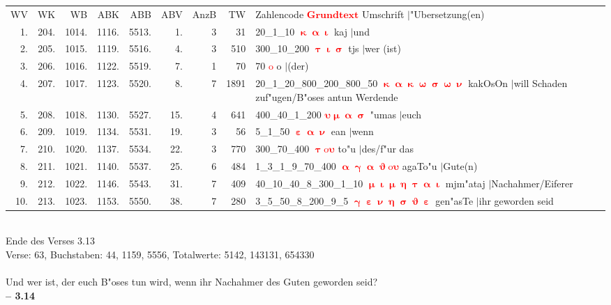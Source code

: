 \documentclass[a4paper,10pt,landscape]{article}
\begin{document}
\begin{tabular}{rrrrrrrrp{120mm}}
WV&WK&WB&ABK&ABB&ABV&AnzB&TW&Zahlencode \textcolor{red}{$\boldsymbol{Grundtext}$} Umschrift $|$"Ubersetzung(en)\\
1.&204.&1014.&1116.&5513.&1.&3&31&20\_1\_10 \textcolor{red}{$\boldsymbol{\upkappa\upalpha\upiota}$} kaj $|$und\\
2.&205.&1015.&1119.&5516.&4.&3&510&300\_10\_200 \textcolor{red}{$\boldsymbol{\uptau\upiota\upsigma}$} tjs $|$wer (ist)\\
3.&206.&1016.&1122.&5519.&7.&1&70&70 \textcolor{red}{$\boldsymbol{\mathrm{o}}$} o $|$(der)\\
4.&207.&1017.&1123.&5520.&8.&7&1891&20\_1\_20\_800\_200\_800\_50 \textcolor{red}{$\boldsymbol{\upkappa\upalpha\upkappa\upomega\upsigma\upomega\upnu}$} kakOsOn $|$will Schaden zuf"ugen/B"oses antun Werdende\\
5.&208.&1018.&1130.&5527.&15.&4&641&400\_40\_1\_200 \textcolor{red}{$\boldsymbol{\upsilon\upmu\upalpha\upsigma}$} "umas $|$euch\\
6.&209.&1019.&1134.&5531.&19.&3&56&5\_1\_50 \textcolor{red}{$\boldsymbol{\upepsilon\upalpha\upnu}$} ean $|$wenn\\
7.&210.&1020.&1137.&5534.&22.&3&770&300\_70\_400 \textcolor{red}{$\boldsymbol{\uptau\mathrm{o}\upsilon}$} to"u $|$des/f"ur das\\
8.&211.&1021.&1140.&5537.&25.&6&484&1\_3\_1\_9\_70\_400 \textcolor{red}{$\boldsymbol{\upalpha\upgamma\upalpha\upvartheta\mathrm{o}\upsilon}$} agaTo"u $|$Gute(n)\\
9.&212.&1022.&1146.&5543.&31.&7&409&40\_10\_40\_8\_300\_1\_10 \textcolor{red}{$\boldsymbol{\upmu\upiota\upmu\upeta\uptau\upalpha\upiota}$} mjm"ataj $|$Nachahmer/Eiferer\\
10.&213.&1023.&1153.&5550.&38.&7&280&3\_5\_50\_8\_200\_9\_5 \textcolor{red}{$\boldsymbol{\upgamma\upepsilon\upnu\upeta\upsigma\upvartheta\upepsilon}$} gen"asTe $|$ihr geworden seid\\
\end{tabular}\medskip \\
Ende des Verses 3.13\\
Verse: 63, Buchstaben: 44, 1159, 5556, Totalwerte: 5142, 143131, 654330\\
\\
Und wer ist, der euch B"oses tun wird, wenn ihr Nachahmer des Guten geworden seid?\\
\newpage 
{\bf -- 3.14}\\
\medskip \\
\end{document}
